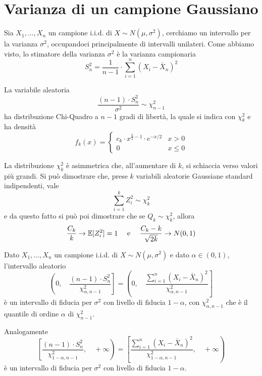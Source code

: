 \section{Varianza di un campione Gaussiano}
Sia $X_1, \dots, X_n$ un campione i.i.d. di $X \sim N(\mu, \sigma^2)$, cerchiamo un intervallo
per la varianza $\sigma^2$, occupandoci principalmente di intervalli unilateri. Come abbiamo visto,
lo stimatore della varianza $\sigma^2$ è la varianza campionaria
\[ S_n^2 = \frac{1}{n-1} \cdot \sum_{i=1}^n (X_i - \bar{X}_n)^2 \]

\begin{proposition}
	La variabile aleatoria
	\[ \frac{(n-1) \cdot S_n^2}{\sigma^2} \sim \chi_{n-1}^2 \]
	ha distribuzione Chi-Quadro a $n-1$ gradi di libertà, la quale si indica con $\chi_k^2$ e
	ha densità
	\[
		f_k(x) = \begin{cases}
			c_k \cdot x^{\frac{k}{2} - 1} \cdot e^{-x/2} & x > 0    \\
			0                                            & x \leq 0
		\end{cases}
	\]
\end{proposition}

La distribuzione $\chi_k^2$ è asimmetrica che, all'aumentare di $k$, si schiaccia verso valori più
grandi. Si può dimostrare che, prese $k$ variabili aleatorie Gaussiane standard indipendenti, vale
\[ \sum_{i=1}^k Z_i^2 \sim \chi_k^2 \]
e da questo fatto si può poi dimostrare che se $Q_k \sim \chi_k^2$, allora
\[ \frac{C_k}{k} \to \mathbb{E}[Z_i^2] = 1 \quad \text{ e } \quad \frac{C_k - k}{\sqrt{2k}} \to N(0, 1) \]

\begin{proposition}
	Dato $X_1, \dots, X_n$ un campione i.i.d. di $X \sim N(\mu, \sigma^2)$ e dato $\alpha \in (0,1)$,
	l'intervallo aleatorio
	\begin{equation*}
		\left( \left. 0, \quad
		\frac{(n-1) \cdot S_n^2}{\chi_{\alpha, n-1}^2} \right] \right. =
		\left( \left. 0, \quad
		\frac{\sum_{i=1}^n (X_i - \bar{X}_n)^2}{\chi_{\alpha, n-1}^2} \right] \right.
	\end{equation*}
	è un intervallo di fiducia per $\sigma^2$ con livello di fiducia $1-\alpha$, con
	$\chi_{\alpha, n-1}^2$ che è il quantile di ordine $\alpha$ di $\chi_{n-1}^2$.
\end{proposition}

Analogamente
\begin{equation*}
	\left[ \left. \frac{(n-1) \cdot S_n^2}{\chi_{1-\alpha, n-1}^2},
	\quad +\infty \right) \right. =
	\left[ \left. \frac{\sum_{i=1}^n (X_i - \bar{X}_n)^2}{\chi_{1-\alpha, n-1}^2},
	\quad +\infty \right) \right.
\end{equation*}
è un intervallo di fiducia per $\sigma^2$ con livello di fiducia $1-\alpha$.
